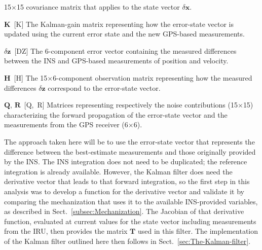 \documentclass[12pt,twoside,english,12pt,twoside,english]{article}\usepackage[]{graphicx}\usepackage[]{color}
\newenvironment{lyxlist}[1]
{\begin{list}{}
{\settowidth{\labelwidth}{#1}
 \setlength{\leftmargin}{\labelwidth}
 \addtolength{\leftmargin}{\labelsep}
 \renewcommand{\makelabel}[1]{##1\hfil}}}
{\end{list}}
\let\OrgIndex\index
\renewcommand*{\index}[1]{\OrgIndex{#1}}
\begin{document}
\begin{lyxlist}{00.00.0000}
15$\times$15 covariance matrix
that applies to the state vector $\delta\mathbf{x}$.
\item [{$\mathbf{K}$~{[}K{]}}] The
Kalman-gain matrix
representing how the error-state vector
is updated using the current error state and the new GPS-based
measurements.
\item [{$\delta\mathbf{z}$~{[}DZ{]}}] The
6-component error vector containing
the measured differences between the INS
and GPS-based measurements
of position and velocity. 
\item [{$\mathbf{H}$~{[}H{]}}] The
15$\times$6-component observation matrix
representing how the measured differences $\delta\mathbf{z}$ correspond
to the error-state vector. 
\item [{$\mathbf{Q},\,\mathbf{R}$~{[}Q,~R{]}}] Matrices
representing respectively the noise contributions (15$\times$15)
characterizing the forward propagation of the error-state
vector and the measurements from the
GPS receiver (6$\times$6).
\end{lyxlist}
The approach taken here will be to use the error-state
vector that represents the difference between the best-estimate measurements
and those originally provided by the INS. The INS
integration does not need to be duplicated; the reference integration
is already available. However, the Kalman filter does need the derivative
vector that leads to that forward integration,
so the first step in this analysis was to develop a function for the
derivative vector and validate it by comparing the mechanization that
uses it to the available INS-provided
variables, as described in Sect.~\ref{subsec:Mechanization}. The
Jacobian of that derivative
function,
evaluated at current values for the state vector
including measurements from the IRU,
then provides the matrix $\mathbf{T}$
used in this filter. The implementation of the Kalman filter outlined
here then follows in Sect.~\ref{sec:The-Kalman-filter}.
\end{document}

